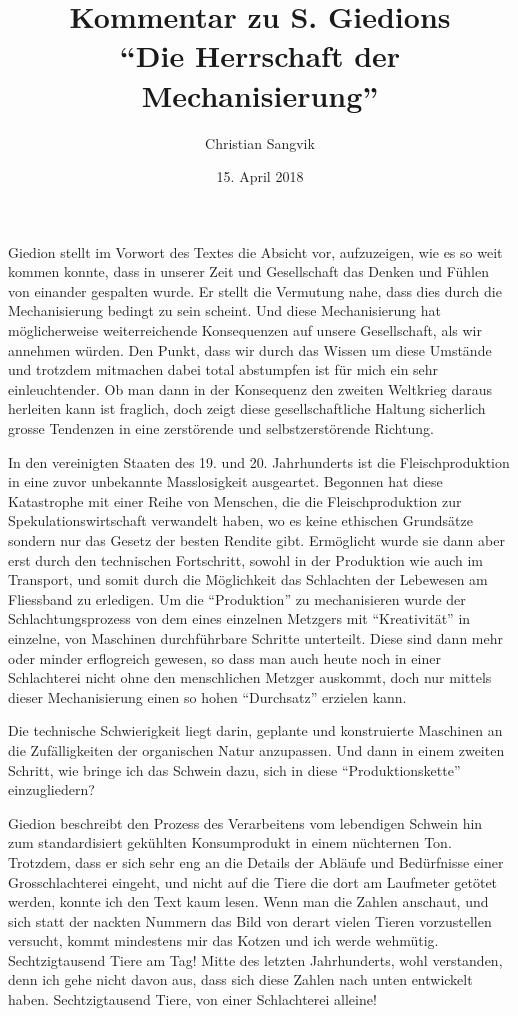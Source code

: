 \documentclass[a4paper,ngerman,11pt]{scrartcl}
\author{Christian Sangvik}
\date{15. April 2018}
\title{Kommentar zu S. Giedions\\"`Die Herrschaft der Mechanisierung"'}
\begin{document}
\maketitle
\noindent
Giedion stellt im Vorwort des Textes die Absicht vor, aufzuzeigen, wie es so
weit kommen konnte, dass in unserer Zeit und Gesellschaft das Denken und Fühlen
von einander gespalten wurde. Er stellt die Vermutung nahe, dass dies durch die
Mechanisierung bedingt zu sein scheint.\cite{Giedion1982} Und diese Mechanisierung
hat möglicherweise weiterreichende Konsequenzen auf unsere Gesellschaft, als wir
annehmen würden. Den Punkt, dass wir durch das Wissen um diese Umstände und
trotzdem mitmachen dabei total abstumpfen ist für mich ein sehr
einleuchtender. Ob man dann in der Konsequenz den zweiten Weltkrieg daraus
herleiten kann ist fraglich, doch zeigt diese gesellschaftliche Haltung
sicherlich grosse Tendenzen in eine zerstörende und selbstzerstörende Richtung.

In den vereinigten Staaten des 19. und 20. Jahrhunderts ist die
Fleischproduktion in eine zuvor unbekannte Masslosigkeit ausgeartet. Begonnen
hat diese Katastrophe mit einer Reihe von Menschen, die die Fleischproduktion
zur Spekulationswirtschaft verwandelt haben, wo es keine ethischen Grundsätze
sondern nur das Gesetz der besten Rendite gibt. Ermöglicht wurde sie dann aber
erst durch den technischen Fortschritt, sowohl in der Produktion wie auch im
Transport, und somit durch die Möglichkeit das Schlachten der Lebewesen am
Fliessband zu erledigen.\cite{Giedion1982} Um die "`Produktion"' zu mechanisieren
wurde der Schlachtungsprozess von dem eines einzelnen Metzgers mit
"`Kreativität"' \cite{Giedion1982} in einzelne, von Maschinen durchführbare
Schritte unterteilt. Diese sind dann mehr oder minder erflogreich gewesen, so
dass man auch heute noch in einer Schlachterei nicht ohne den menschlichen
Metzger auskommt, doch nur mittels dieser Mechanisierung einen so hohen
"`Durchsatz"' erzielen kann.

Die technische Schwierigkeit liegt darin, geplante und konstruierte Maschinen an
die Zufälligkeiten der organischen Natur anzupassen. Und dann in einem zweiten
Schritt, wie bringe ich das Schwein dazu, sich in diese "`Produktionskette"'
einzugliedern?

Giedion beschreibt den Prozess des Verarbeitens vom lebendigen Schwein hin zum
standardisiert gekühlten Konsumprodukt in einem nüchternen Ton. Trotzdem, dass
er sich sehr eng an die Details der Abläufe und Bedürfnisse einer
Grosschlachterei eingeht, und nicht auf die Tiere die dort am Laufmeter getötet
werden, konnte ich den Text kaum lesen. Wenn man die Zahlen anschaut, und sich
statt der nackten Nummern das Bild von derart vielen Tieren vorzustellen
versucht, kommt mindestens mir das Kotzen und ich werde
wehmütig. Sechtzigtausend Tiere am Tag! Mitte des letzten Jahrhunderts, wohl
verstanden, denn ich gehe nicht davon aus, dass sich diese Zahlen nach unten
entwickelt haben. Sechtzigtausend Tiere, von einer Schlachterei alleine!
\end{document}

